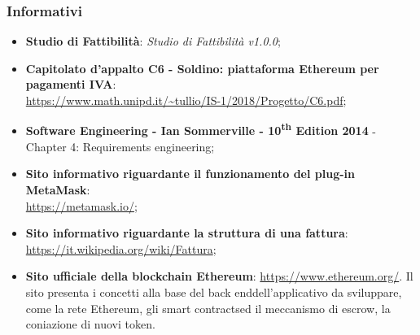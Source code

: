 \subsubsection{Informativi}
\begin{itemize}
	\item \textbf{Studio di Fattibilità}: \textit{Studio di Fattibilità v1.0.0};
	\item \textbf{Capitolato d'appalto C6 - Soldino: piattaforma Ethereum per pagamenti IVA}: \\ \url{ https://www.math.unipd.it/~tullio/IS-1/2018/Progetto/C6.pdf};
	\item \textbf{Software Engineering - Ian Sommerville - 10\textsuperscript{th} Edition 2014}
	\subitem - Chapter 4: Requirements engineering;
	\item \textbf{Sito informativo riguardante il funzionamento del plug-in MetaMask}:\\ \textsf{\url{ https://metamask.io/}};
	\item \textbf{Sito informativo riguardante la struttura di una fattura}:\\ \textsf{\url{ https://it.wikipedia.org/wiki/Fattura}};
	\item \textbf{Sito ufficiale della blockchain Ethereum}: \textsf{\url{https://www.ethereum.org/}}. Il sito presenta i concetti alla base del back end\glosp dell'applicativo da sviluppare, come la rete Ethereum\glo, gli smart contracts\glosp ed il meccanismo di escrow\glo, la coniazione di nuovi token\glo. 

\end{itemize}